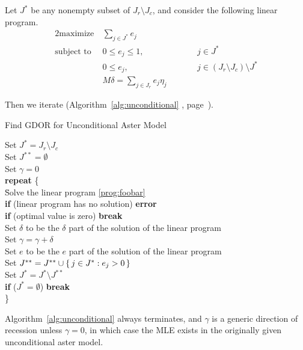Let $J^{*}$ be any nonempty subset of $J_r \setminus J_c$,
and consider the following linear program.
\begin{alignat}{2}
  \text{maximize}   & \ \sum_{j \in J^{*}} e_j
  \nonumber
  \\
  \text{subject to} & \ 0 \le e_j \le 1, & \qquad & j \in J^{*}
  \label{prog:foobar}
  \\
                    & \ 0 \le e_j, & \qquad &
                      j \in (J_r \setminus J_c) \setminus J^{*}
  \nonumber
  \\
                    & \ M \delta = \sum_{j \in J_r} e_j \eta_j
  \nonumber
\end{alignat}

Then we iterate
(Algorithm~\ref{alg:unconditional}
{, page~\pageref{alg:unconditional}).}
\begin{algorithm}
\caption{Find GDOR for Unconditional Aster Model}
\label{alg:unconditional}
\begin{tabbing}
Set $J^{*} = J_r \setminus J_c$\\
Set $J^{{*}{*}} = \emptyset$\\
Set $\gamma = 0$\\
\textbf{repeat} \{\\
\qquad \= Solve the linear program \eqref{prog:foobar}\\
\> \textbf{if} (linear program has no solution) \textbf{error}\\
\> \textbf{if} (optimal value is zero) \textbf{break}\\
\> Set $\delta$ to be the $\delta$ part of the solution of the linear program\\
\> Set $\gamma = \gamma + \delta$\\
\> Set $e$ to be the $e$ part of the solution of the linear program\\
\> Set $J^{**} = J^{**} \cup \{\, j \in J^{*} : e_j > 0 \,\}$\\
\> Set $J^{*} = J^{*} \setminus J^{{*}{*}}$\\
\> \textbf{if} ($J^{*} = \emptyset$) \textbf{break}\\
\}
\end{tabbing}
\end{algorithm}
\begin{theorem} \label{th:lin-prog-two}
Algorithm~\ref{alg:unconditional} always terminates, and $\gamma$ is
a generic direction of recession unless $\gamma = 0$, in which case
the MLE exists in the originally given unconditional aster model.
\end{theorem}
